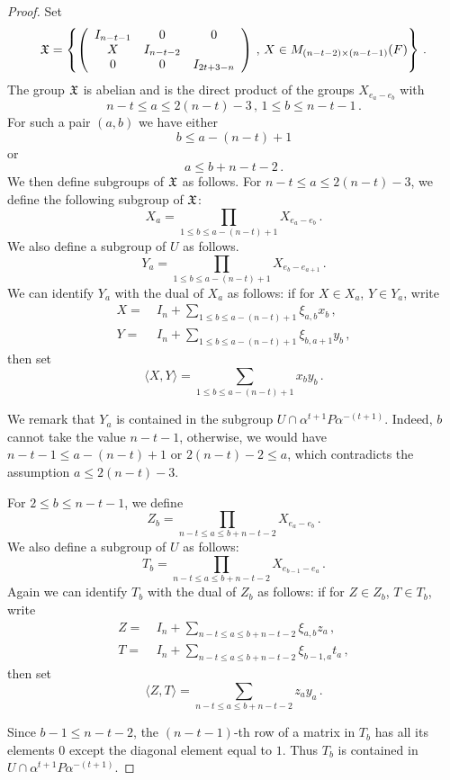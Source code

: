 \documentclass[12pt]{amsart}
\begin{document}
\begin{proof}
 
Set 
\[\frak{X}= \left\{\left( \begin{array}{c c c} I_{n-t-1} & 0 & 0 \\ X & I_{n-t-2} \\ 0&0& I_{2 t + 3 -n} \end{array}\right)\,,\,
X \in M_{(n-t-2) \times (n-t-1)}(F) \right\}\,.\]
The group $\frak{X}$ is abelian and is the direct product of the groups $X_{e_a-e_b}$ with
\[ n-t\leq a \leq 2(n-t)-3\,,\, 1 \leq b\leq n -t-1 \,.\]
For such a pair $(a,b)$ we have either
\[ b\leq a-(n-t)+1 \]
or
\[ a \le b + n-t-2 \,.\]
We then define subgroups of $\frak{X}$ as follows.
For $n -t \leq a \leq 2(n-t)-3$, we define the following subgroup of $\frak{X}$:
\[ X_a= \prod_{1 \leq b \leq a -(n-t) +1} X_{e_a-e_b}\,.\]
We also define a subgroup of $U$  as follows. 
\[  Y_a = \prod_{1 \leq b \leq a -(n-t) +1} X_{e_b -e _{a+1}} \,.\]
We can identify $Y_a$ with the dual of $X_a$ as follows: if for $X\in X_a$, $Y\in Y_a$, write
\begin{align*}
X =\ & I_n+ \sum _{1 \leq b \leq a -(n-t) +1} \xi_{a,b} x_b \,,\\
Y =\ & I_n + \sum_{ 1 \leq b \leq a -(n-t) +1} \xi_{b,a+1} y_b\,,
\end{align*}
then set
\[ \langle X,Y\rangle = \sum_{ 1 \leq b \leq a -(n-t) +1} x_b y_b \,.\]

We remark that $Y_a$ is contained in the subgroup $U \cap \alpha^{t+1} P
\alpha ^{-(t+1)}$. Indeed, $b$ cannot take the value $n-t-1$, otherwise, we would have $n-t-1\leq a-(n-t)+1$ or $2(n-t)-2 \leq a$, which contradicts the assumption $a\leq 2(n-t)-3$. 

For $2\leq b \leq n-t-1$, we define
\[ Z_b = \prod_{n-t\leq a \leq b+ n-t-2} X_{e_a-e_b} \,.\]
We also define a subgroup of $U$  as follows:
\[ T_b = \prod_{n-t\leq a \leq b+ n-t-2} X_{e_{b-1}-e_a} \,.\]
Again we can identify $T_b$ with the dual of $Z_b$ as follows: if for $Z\in Z_b$, $T\in T_b$, write
\begin{align*}
Z =\ & I_n+  \sum_{ n-t\leq a \leq b+ n-t-2} \xi _{a,b} z_a \,,\\
T= \ & I_n + \sum_{ n-t\leq a \leq b+ n-t-2} \xi _{b-1,a} t_a\,,
\end{align*}
then set
\[ \langle Z , T\rangle = \sum_{ n-t\leq a \leq b+ n-t-2} z_a y_a \,.\]

Since $b-1\leq n-t-2$, the $(n-t-1)$-th row of a matrix in $T_b$ has all its elements $0$ except the diagonal element equal to $1$. Thus $T_b$ is contained in $U \cap \alpha^{t+1}P \alpha^{-(t+1)}$.


\end{proof}
\end{document}
